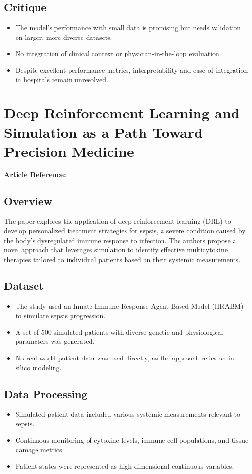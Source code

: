 \subsection*{Critique}
\begin{itemize}
    \item The model's performance with small data is promising but needs validation on larger, more diverse datasets.
    \item No integration of clinical context or physician-in-the-loop evaluation.
    \item Despite excellent performance metrics, interpretability and ease of integration in hospitals remain unresolved.
\end{itemize}

\section{Deep Reinforcement Learning and Simulation as a Path Toward Precision Medicine}
\textbf{Article Reference:} \cite{article_13}

\subsection*{Overview}
The paper explores the application of deep reinforcement learning (DRL) to develop personalized treatment strategies for sepsis, a severe condition caused by the body's dysregulated immune response to infection. The authors propose a novel approach that leverages simulation to identify effective multicytokine therapies tailored to individual patients based on their systemic measurements.

\subsection*{Dataset}
\begin{itemize}
    \item The study used an Innate Immune Response Agent-Based Model (IIRABM) to simulate sepsis progression.
    \item A set of 500 simulated patients with diverse genetic and physiological parameters was generated.
    \item No real-world patient data was used directly, as the approach relies on in silico modeling.
\end{itemize}

\subsection*{Data Processing}
\begin{itemize}
    \item Simulated patient data included various systemic measurements relevant to sepsis.
    \item Continuous monitoring of cytokine levels, immune cell populations, and tissue damage metrics.
    \item Patient states were represented as high-dimensional continuous variables.
\end{itemize}

